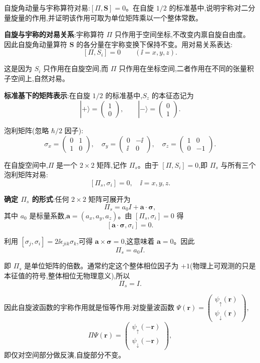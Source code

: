 \begin{question}
自旋角动量与宇称算符对易:$[\Pi,\mathbf S]=0$。在自旋 $1/2$ 的标准基中,说明宇称对二分量旋量的作用,并证明该作用可取为单位矩阵乘以一个整体常数。
\end{question}
\begin{solution}
	\textbf{自旋与宇称的对易关系}:宇称算符 $\Pi$ 只作用于空间坐标,不改变内禀自旋自由度。因此自旋角动量算符 $\mathbf S$ 的各分量在宇称变换下保持不变。用对易关系表达:
	\[
	[\Pi,S_i]=0\qquad (\ii=x,y,z).
	\]

	这是因为 $S_i$ 只作用在自旋空间,而 $\Pi$ 只作用在坐标空间,二者作用在不同的张量积子空间上,自然对易。

	\textbf{标准基下的矩阵表示}:在自旋 $1/2$ 的标准基中,$S_z$ 的本征态记为
	\[
	|+\rangle = \begin{pmatrix}1\\0\end{pmatrix},\qquad |-\rangle = \begin{pmatrix}0\\1\end{pmatrix}.
	\]

	泡利矩阵(忽略 $\hbar/2$ 因子):
	\[
	\sigma_x=\begin{pmatrix}0&1\\1&0\end{pmatrix},\quad
	\sigma_y=\begin{pmatrix}0&-\ii\\\ii&0\end{pmatrix},\quad
	\sigma_z=\begin{pmatrix}1&0\\0&-1\end{pmatrix}.
	\]

	在自旋空间中,$\Pi$ 是一个 $2\times2$ 矩阵,记作 $\Pi_s$。由于 $[\Pi,S_i]=0$,即 $\Pi_s$ 与所有三个泡利矩阵对易:
	\[
	[\Pi_s,\sigma_i]=0,\quad \ii=x,y,z.
	\]

	\textbf{确定 $\Pi_s$ 的形式}:任何 $2\times2$ 矩阵可展开为
	\[
	\Pi_s = a_0 I + \mathbf a\cdot\boldsymbol\sigma,
	\]
	其中 $a_0$ 是标量系数,$\mathbf a=(a_x,a_y,a_z)$。由 $[\Pi_s,\sigma_i]=0$ 得
	\[
	[\mathbf a\cdot\boldsymbol\sigma,\sigma_i]=0.
	\]

	利用 $[\sigma_j,\sigma_i]=2\ii\epsilon_{jik}\sigma_k$,可得 $\mathbf a\times\boldsymbol\sigma=0$,这意味着 $\mathbf a=0$。因此
	\[
	\Pi_s = a_0 I.
	\]

	\noindent 即 $\Pi_s$ 是单位矩阵的倍数。通常约定这个整体相位因子为 $+1$(物理上可观测的只是本征值的符号,整体相位无物理意义),所以
	\[
	\boxed{\Pi_s = I}.
	\]

	因此自旋波函数的宇称作用就是恒等作用:对旋量波函数 $\Psi(\mathbf r)=\begin{pmatrix}\psi_\uparrow(\mathbf r)\\\psi_\downarrow(\mathbf r)\end{pmatrix}$,
	\[
	\Pi\Psi(\mathbf r)=\begin{pmatrix}\psi_\uparrow(-\mathbf r)\\\psi_\downarrow(-\mathbf r)\end{pmatrix},
	\]
	即仅对空间部分做反演,自旋部分不变。
	\end{solution}

